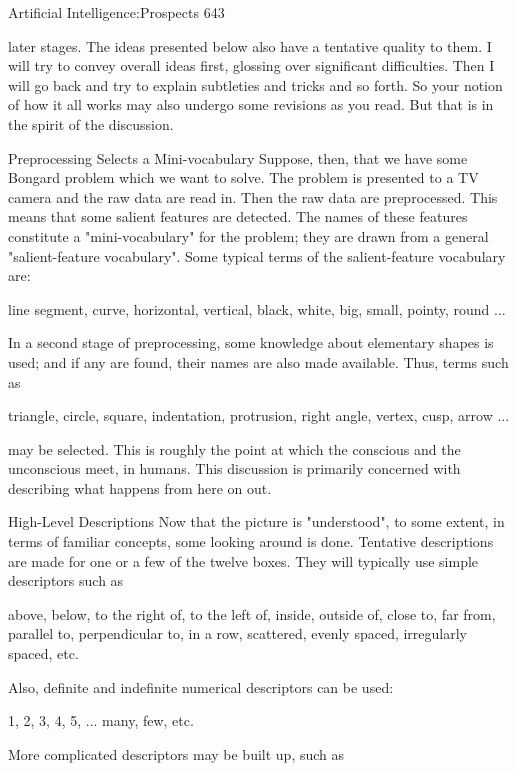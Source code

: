 Artificial Intelligence:Prospects                                                      643

later stages. The ideas presented below also have a tentative quality to them. I will try to
convey overall ideas first, glossing over significant difficulties. Then I will go back and
try to explain subtleties and tricks and so forth. So your notion of how it all works may
also undergo some revisions as you read. But that is in the spirit of the discussion.

                    Preprocessing Selects a Mini-vocabulary
Suppose, then, that we have some Bongard problem which we want to solve. The
problem is presented to a TV camera and the raw data are read in. Then the raw data are
preprocessed. This means that some salient features are detected. The names of these
features constitute a "mini-vocabulary" for the problem; they are drawn from a general
"salient-feature vocabulary". Some typical terms of the salient-feature vocabulary are:

       line segment, curve, horizontal, vertical, black, white, big, small, pointy, round ...

In a second stage of preprocessing, some knowledge about elementary shapes is used;
and if any are found, their names are also made available. Thus, terms such as

       triangle, circle, square, indentation, protrusion, right angle, vertex, cusp, arrow ...

may be selected. This is roughly the point at which the conscious and the unconscious
meet, in humans. This discussion is primarily concerned with describing what happens
from here on out.

                                High-Level Descriptions
Now that the picture is "understood", to some extent, in terms of familiar concepts, some
looking around is done. Tentative descriptions are made for one or a few of the twelve
boxes. They will typically use simple descriptors such as

        above, below, to the right of, to the left of, inside, outside of, close to, far from,
parallel to, perpendicular to, in a row, scattered, evenly spaced, irregularly spaced, etc.

Also, definite and indefinite numerical descriptors can be used:

       1, 2, 3, 4, 5, ... many, few, etc.

More complicated descriptors may be built up, such as

